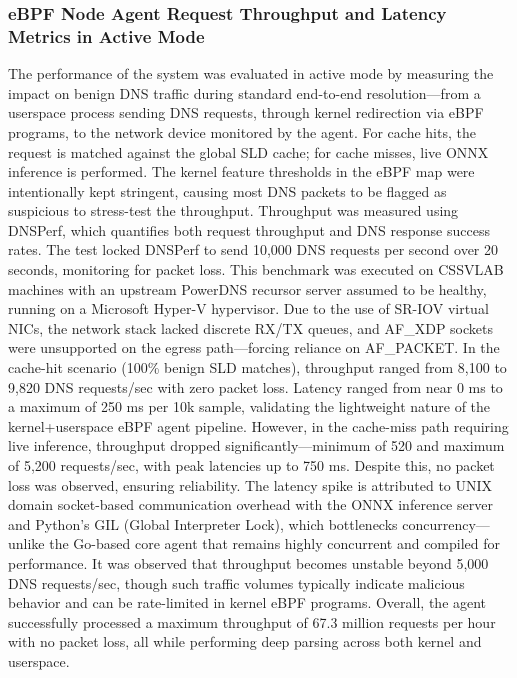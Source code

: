 \documentclass [11pt, proquest] {uwthesis}[2020/02/24]
\begin{document}
\subsubsection{eBPF Node Agent Request Throughput and Latency Metrics in Active Mode}
The performance of the system was evaluated in active mode by measuring the impact on benign DNS traffic during standard end-to-end resolution—from a userspace process sending DNS requests, through kernel redirection via eBPF programs, to the network device monitored by the agent. For cache hits, the request is matched against the global SLD cache; for cache misses, live ONNX inference is performed. The kernel feature thresholds in the eBPF map were intentionally kept stringent, causing most DNS packets to be flagged as suspicious to stress-test the throughput. Throughput was measured using DNSPerf, which quantifies both request throughput and DNS response success rates. The test locked DNSPerf to send 10,000 DNS requests per second over 20 seconds, monitoring for packet loss. This benchmark was executed on CSSVLAB machines with an upstream PowerDNS recursor server assumed to be healthy, running on a Microsoft Hyper-V hypervisor. Due to the use of SR-IOV virtual NICs, the network stack lacked discrete RX/TX queues, and AF\_XDP sockets were unsupported on the egress path—forcing reliance on AF\_PACKET. In the cache-hit scenario (100\% benign SLD matches), throughput ranged from 8,100 to 9,820 DNS requests/sec with zero packet loss. Latency ranged from near 0 ms to a maximum of 250 ms per 10k sample, validating the lightweight nature of the kernel+userspace eBPF agent pipeline. However, in the cache-miss path requiring live inference, throughput dropped significantly—minimum of 520 and maximum of 5,200 requests/sec, with peak latencies up to 750 ms. Despite this, no packet loss was observed, ensuring reliability. The latency spike is attributed to UNIX domain socket-based communication overhead with the ONNX inference server and Python’s GIL (Global Interpreter Lock), which bottlenecks concurrency—unlike the Go-based core agent that remains highly concurrent and compiled for performance.
It was observed that throughput becomes unstable beyond 5,000 DNS requests/sec, though such traffic volumes typically indicate malicious behavior and can be rate-limited in kernel eBPF programs. Overall, the agent successfully processed a maximum throughput of 67.3 million requests per hour with no packet loss, all while performing deep parsing across both kernel and userspace.
\end{document}
